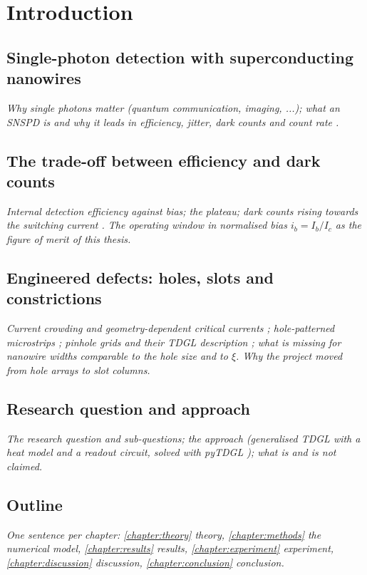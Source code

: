 \chapter{Introduction}
\label{chapter:introduction}

\section{Single-photon detection with superconducting nanowires}
\label{sec:intro-snspd}

\emph{Why single photons matter (quantum communication, imaging, ...); what an SNSPD is and why it leads in
efficiency, jitter, dark counts and count rate \cite{esmaeilzadeh2021,natarajan2012,venza2025}.}

\section{The trade-off between efficiency and dark counts}
\label{sec:intro-tradeoff}

\emph{Internal detection efficiency against bias; the plateau; dark counts rising towards the switching current
\cite{engel2015}. The operating window in normalised bias $i_b = I_b/I_c$ as the figure of merit of this thesis.}

\section{Engineered defects: holes, slots and constrictions}
\label{sec:intro-defects}

\emph{Current crowding and geometry-dependent critical currents \cite{clem2011}; hole-patterned microstrips
\cite{li2022,li2025}; pinhole grids and their TDGL description \cite{zhu2023,zhu2025}; what is missing for
nanowire widths comparable to the hole size and to $\xi$. Why the project moved from hole arrays to slot
columns.}

\section{Research question and approach}
\label{sec:intro-question}

\emph{The research question and sub-questions; the approach (generalised TDGL with a heat model and a readout
circuit, solved with pyTDGL \cite{bishopvanhorn2023}); what is and is not claimed.}

\section{Outline}
\label{sec:intro-outline}

\emph{One sentence per chapter: \cref{chapter:theory} theory, \cref{chapter:methods} the numerical model,
\cref{chapter:results} results, \cref{chapter:experiment} experiment, \cref{chapter:discussion} discussion,
\cref{chapter:conclusion} conclusion.}
